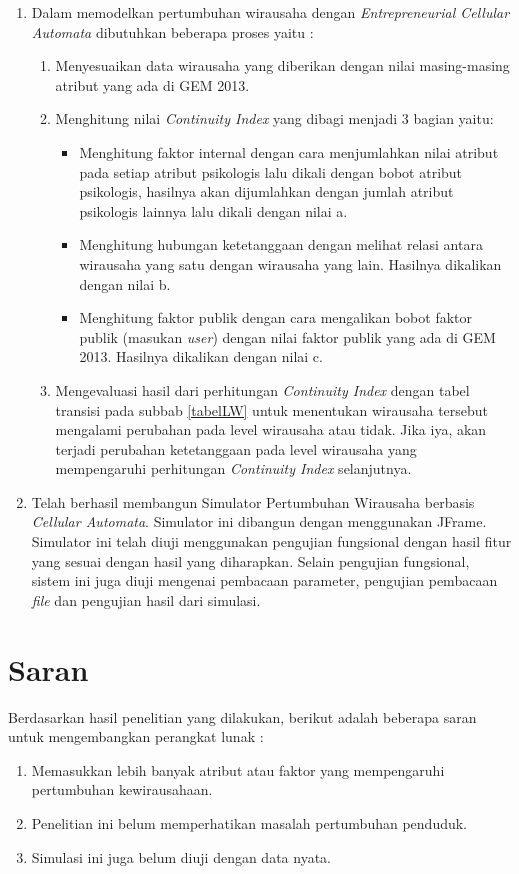 \begin{enumerate}
	\item Dalam memodelkan pertumbuhan wirausaha dengan \textit{Entrepreneurial Cellular Automata} dibutuhkan beberapa proses yaitu :
	\begin{enumerate}
		\item Menyesuaikan data wirausaha yang diberikan dengan nilai masing-masing atribut yang ada di GEM 2013.
		\item Menghitung nilai \textit{Continuity Index} yang dibagi menjadi 3 bagian yaitu:
		\begin{itemize}
			\item Menghitung faktor internal dengan cara menjumlahkan nilai atribut pada setiap atribut psikologis lalu dikali dengan bobot atribut psikologis, hasilnya akan dijumlahkan dengan jumlah atribut psikologis lainnya lalu dikali dengan nilai a.
			\item Menghitung hubungan ketetanggaan dengan melihat relasi antara wirausaha yang satu dengan wirausaha yang lain. Hasilnya dikalikan dengan nilai b.
			\item Menghitung faktor publik dengan cara mengalikan bobot faktor publik (masukan \textit{user}) dengan nilai faktor publik yang ada di GEM 2013. Hasilnya dikalikan dengan nilai c.
		\end{itemize}
		\item Mengevaluasi hasil dari perhitungan \textit{Continuity Index} dengan tabel transisi pada subbab \ref{tabelLW} untuk menentukan wirausaha tersebut mengalami perubahan pada level wirausaha atau tidak. Jika iya, akan terjadi perubahan ketetanggaan pada level wirausaha yang mempengaruhi perhitungan \textit{Continuity Index} selanjutnya.
	\end{enumerate}
	\item Telah berhasil membangun Simulator Pertumbuhan Wirausaha berbasis \textit{Cellular Automata}. Simulator ini dibangun dengan menggunakan JFrame. Simulator ini telah diuji menggunakan pengujian fungsional dengan hasil fitur yang sesuai dengan hasil yang diharapkan. Selain pengujian fungsional, sistem ini juga diuji mengenai pembacaan parameter, pengujian pembacaan \textit{file} dan pengujian hasil dari simulasi.
\end{enumerate}

\section{Saran}
Berdasarkan hasil penelitian yang dilakukan, berikut adalah beberapa saran untuk mengembangkan perangkat lunak :
\begin{enumerate}
	\item Memasukkan lebih banyak atribut atau faktor yang mempengaruhi pertumbuhan kewirausahaan.
	\item Penelitian ini belum memperhatikan masalah pertumbuhan penduduk.
	\item Simulasi ini juga belum diuji dengan data nyata.
\end{enumerate}